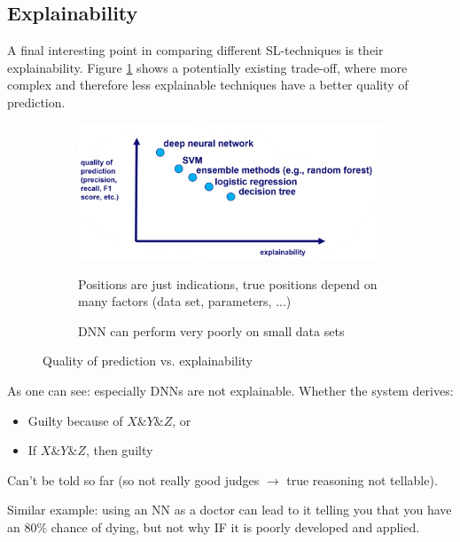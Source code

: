 \subsection{Explainability}

A final interesting point in comparing different SL-techniques is their explainability. Figure \ref{fig:7_explain_tradeoff} shows a potentially existing trade-off, where more complex and therefore less explainable techniques have a better quality of prediction.

\begin{figure}[H]
  \centering
  \begin{subfigure}{0.8\textwidth}
    \centering
    \includegraphics[width=\textwidth]{assets/sl/explain__tradeoff.png}
    \begin{note}
      Positions are just indications, true positions depend on many factors (data set, parameters, ...)

      DNN can perform very poorly on small data sets
    \end{note}
  \end{subfigure}

  \caption{Quality of prediction vs. explainability}
  \label{fig:7_explain_tradeoff}
\end{figure}

As one can see: especially DNNs are not explainable. Whether the system derives:
\begin{itemize}
  \item Guilty because of $X\& Y\& Z$, or
  \item If $X \& Y \& Z$, then guilty
\end{itemize}
Can't be told so far (so not really good judges $\rightarrow$ true reasoning not tellable).

Similar example: using an NN as a doctor can lead to it telling you that you have an $80\%$ chance of dying, but not why IF it is poorly developed and applied.